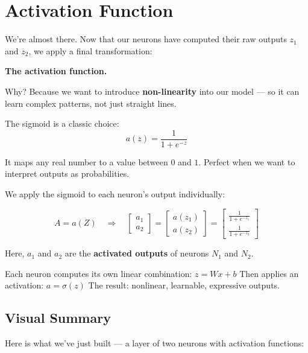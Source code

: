 \documentclass[11pt]{article}
\begin{document}
\section{Activation Function}

We’re almost there.  
Now that our neurons have computed their raw outputs $z_1$ and $z_2$, we apply a final transformation:

\begin{center}
    \textbf{The activation function.}
\end{center}

Why?  
Because we want to introduce \textbf{non-linearity} into our model —  
so it can learn complex patterns, not just straight lines.

\begin{defbox}[title=Sigmoid Activation Function]
The sigmoid is a classic choice:
\[
a(z) = \frac{1}{1 + e^{-z}}
\]

It maps any real number to a value between $0$ and $1$.  
Perfect when we want to interpret outputs as probabilities.
\end{defbox}

We apply the sigmoid to each neuron's output individually:

\[
A = a(Z)
\quad \Rightarrow \quad
\begin{bmatrix}
a_1 \\
a_2
\end{bmatrix}
=
\begin{bmatrix}
a(z_1) \\
a(z_2)
\end{bmatrix}
=
\begin{bmatrix}
\frac{1}{1 + e^{-z_1}} \\
\frac{1}{1 + e^{-z_2}}
\end{bmatrix}
\]

Here, $a_1$ and $a_2$ are the \textbf{activated outputs} of neurons $N_1$ and $N_2$.

\begin{insightbox}[title=Key Insight]
Each neuron computes its own linear combination: $z = Wx + b$  
Then applies an activation: $a = \sigma(z)$  
The result: nonlinear, learnable, expressive outputs.
\end{insightbox}

\subsection{Visual Summary}

Here is what we’ve just built — a layer of two neurons with activation functions:
\end{document}
